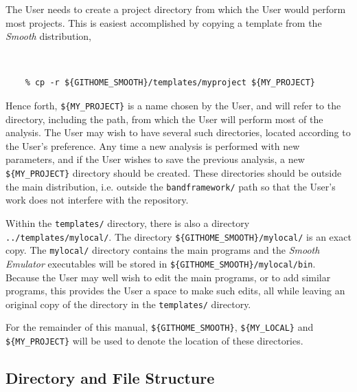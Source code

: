 \documentclass[UserManual.tex]{subfiles}
\begin{document}
The User needs to create a project directory from which the User would perform most projects. This is easiest accomplished by copying a template from the {\it Smooth} distribution,
{\tt
\begin{verbatim}
    % cp -r ${GITHOME_SMOOTH}/templates/myproject ${MY_PROJECT}
\end{verbatim}
}
Hence forth, {\tt \$\{MY\_PROJECT\}} is a name chosen by the User, and will refer to the directory, including the path, from which the User will perform most of the analysis. The User may wish to have several such directories, located according to the User's preference. Any time a new analysis is performed with new parameters, and if the User wishes to save the previous analysis, a new {\tt \$\{MY\_PROJECT\}} directory should be created. These directories should be outside the main distribution, i.e. outside the {\tt bandframework/} path so that the User's work does not interfere with the repository. 

Within the {\tt templates/} directory, there is also a directory {\tt ../templates/mylocal/}. The directory {\tt \$\{GITHOME\_SMOOTH\}/mylocal/} is an exact copy. The {\tt mylocal/} directory contains the main programs and the {\it Smooth Emulator} executables will be stored in {\tt \$\{GITHOME\_SMOOTH\}/mylocal/bin}. Because the User may well wish to edit the main programs, or to add similar programs, this provides the User a space to make such edits, all while leaving an original copy of the directory in the {\tt templates/} directory. 

For the remainder of this manual, {\tt \$\{GITHOME\_SMOOTH\}}, {\tt \$\{MY\_LOCAL\}} and {\tt \$\{MY\_PROJECT\}} will be used to denote the location of these directories.

\subsection{Directory and File Structure}
\end{document}
